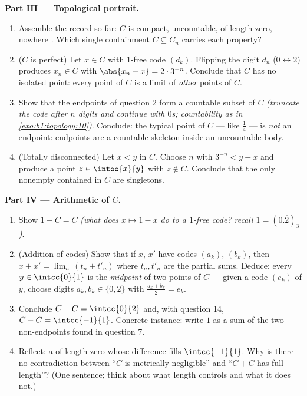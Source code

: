 \begin{problem}[{Weekend problem --- the Cantor middle-thirds
\omterm{def:b1:logic:sets}{set}: length zero, uncountable, perfect, and $C + C =
\intcc{0}{2}$}]
\medskip
\noindent\textbf{Part III --- Topological portrait.}
\begin{enumerate}[resume]
  \item Assemble the record so far: $C$ is compact, uncountable,
        of length zero, nowhere . Which single containment
        $C \subseteq C_n$ carries each property?
  \item ($C$ is perfect) Let $x \in C$ with $1$-free code
        $(d_k)$. Flipping the digit $d_n$ ($0 \leftrightarrow
        2$) produces $x_n \in C$ with $\abs{x_n - x} = 2 \cdot
        3^{-n}$. Conclude that $C$ has no isolated point: every
        point of $C$ is a limit of \emph{other} points of $C$.
  \item Show that the endpoints of question 2 form a countable
         subset of $C$ \emph{(truncate the code after $n$
        digits and continue with $0$s; countability as in
        \cref{exo:b1:topology:10})}. Conclude: the typical point
        of $C$ --- like $\frac14$ --- is \emph{not} an endpoint:
        endpoints are a countable skeleton inside an uncountable
        body.
  \item (Totally disconnected) Let $x < y$ in $C$. Choose $n$
        with $3^{-n} < y - x$ and produce a point $z \in
        \intoo{x}{y}$ with $z \notin C$. Conclude that the only
        nonempty  contained in $C$ are singletons.
\end{enumerate}

\medskip
\noindent\textbf{Part IV --- Arithmetic of $C$.}
\begin{enumerate}[resume]
  \item Show $1 - C = C$ \emph{(what does $x \mapsto 1 - x$ do
        to a $1$-free code? recall $1 = (0.\overline{2})_3$)}.
  \item (Addition of codes) Show that if $x$, $x'$ have codes
        $(a_k)$, $(b_k)$, then $x + x' = \lim_n\,(t_n + t'_n)$
        where $t_n, t'_n$ are the partial sums. Deduce: every $y
        \in \intcc{0}{1}$ is the \emph{midpoint} of two points
        of $C$ --- given a code $(e_k)$ of $y$, choose digits
        $a_k, b_k \in \{0, 2\}$ with $\frac{a_k + b_k}{2} =
        e_k$.
  \item Conclude $C + C = \intcc{0}{2}$ and, with question 14,
        $C - C = \intcc{-1}{1}$. Concrete instance: write $1$ as
        a sum of the two non-endpoints found in question 7.
  \item Reflect: a  of length zero whose difference  fills
        $\intcc{-1}{1}$. Why is there no contradiction between
        ``$C$ is metrically negligible'' and ``$C + C$ has full
        length''? (One sentence; think about what length
        controls and what it does not.)
\end{enumerate}


\end{problem}
